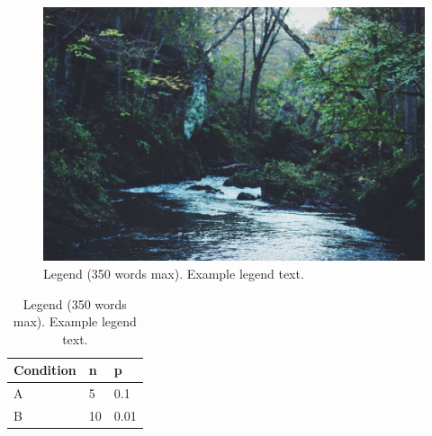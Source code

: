 \documentclass[fleqn,10pt]{wlscirep}
\begin{document}
\begin{figure}[ht]
\centering
\includegraphics[width=\linewidth]{stream}
\caption{Legend (350 words max). Example legend text.}
\label{fig:stream}
\end{figure}

\begin{table}[ht]
\centering
\begin{tabular}{|l|l|l|}
\hline
Condition & n & p \\
\hline
A & 5 & 0.1 \\
\hline
B & 10 & 0.01 \\
\hline
\end{tabular}
\caption{\label{tab:example}Legend (350 words max). Example legend text.}
\end{table}
\fi
\end{document}
